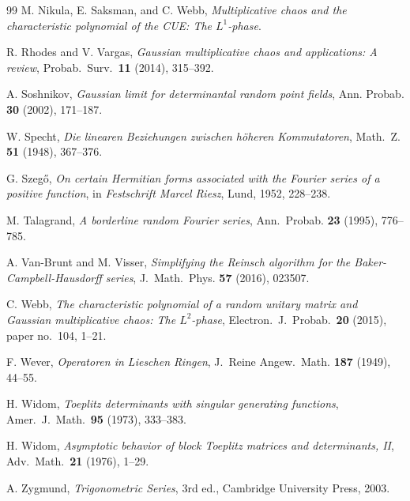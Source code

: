 \documentclass[11pt]{amsart}
\theoremstyle{plain}
\theoremstyle{remark}
\numberwithin{equation}{section}
\begin{document}
\begin{thebibliography}{99}
M. Nikula, E. Saksman, and C. Webb,
\emph{Multiplicative chaos and the characteristic polynomial of the CUE: The $L^1$-phase}.

R. Rhodes and V. Vargas,
\emph{Gaussian multiplicative chaos and applications: A review},
Probab.\ Surv.\ \textbf{11} (2014), 315--392.


 A. Soshnikov, \emph{Gaussian limit for determinantal random point fields}, Ann. Probab. \textbf{30} (2002), 171–187.


 W. Specht, \emph{Die linearen Beziehungen zwischen höheren Kommutatoren}, Math.\ Z. \textbf{51} (1948), 367--376.

G. Szeg\H{o},
\emph{On certain Hermitian forms associated with the Fourier series of a positive function},
in \emph{Festschrift Marcel Riesz},
Lund, 1952, 228--238.

 M. Talagrand, \emph{A borderline random Fourier series}, Ann.\ Probab. \textbf{23} (1995), 776--785.



 A. Van-Brunt and M. Visser, \emph{Simplifying the Reinsch algorithm for the Baker-Campbell-Hausdorff series}, J.\ Math.\ Phys. \textbf{57} (2016), 023507.


C. Webb,
\emph{The characteristic polynomial of a random unitary matrix and Gaussian multiplicative chaos: The $L^2$-phase},
Electron.\ J.\ Probab.\ \textbf{20} (2015), paper no.~104, 1--21.

 F. Wever, \emph{Operatoren in Lieschen Ringen}, J.\ Reine Angew.\ Math. \textbf{187} (1949), 44--55.


H. Widom,
\emph{Toeplitz determinants with singular generating functions},
Amer.\ J.\ Math.\ \textbf{95} (1973), 333--383.

H. Widom,
\emph{Asymptotic behavior of block Toeplitz matrices and determinants, II},
Adv.\ Math.\ \textbf{21} (1976), 1--29.

 A. Zygmund, \emph{Trigonometric Series}, 3rd ed., Cambridge University Press, 2003.
\end{thebibliography}
\end{document}
